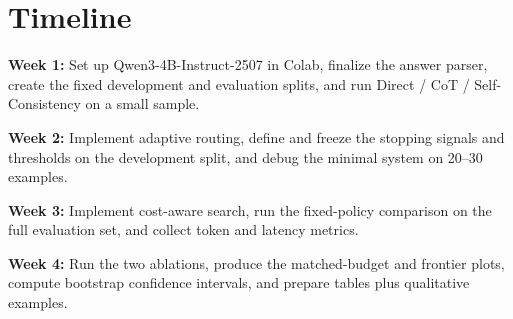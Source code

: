 \documentclass[10pt]{article}
\begin{document}
\section{Timeline}
\textbf{Week 1:} Set up Qwen3-4B-Instruct-2507 in Colab, finalize the answer parser, create the fixed development and evaluation splits, and run Direct / CoT / Self-Consistency on a small sample.

\textbf{Week 2:} Implement adaptive routing, define and freeze the stopping signals and thresholds on the development split, and debug the minimal system on 20--30 examples.

\textbf{Week 3:} Implement cost-aware search, run the fixed-policy comparison on the full evaluation set, and collect token and latency metrics.

\textbf{Week 4:} Run the two ablations, produce the matched-budget and frontier plots, compute bootstrap confidence intervals, and prepare tables plus qualitative examples.
\end{document}
